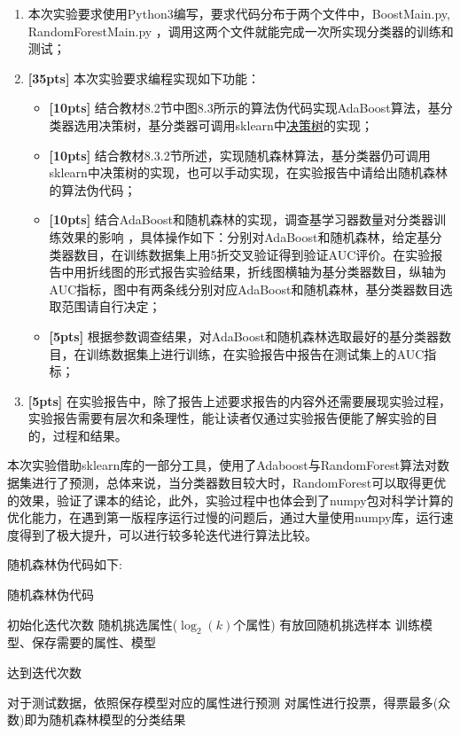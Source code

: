 \documentclass[a4paper,UTF8]{article}
\theoremstyle{definition}
\begin{document}
\begin{enumerate}[(1)]
	\item 本次实验要求使用Python3编写，要求代码分布于两个文件中，BoostMain.py, RandomForestMain.py ，调用这两个文件就能完成一次所实现分类器的训练和测试；
	
	\item \textbf{[35pts]} 本次实验要求编程实现如下功能：
	
	\begin{itemize}
		\item \textbf{[10pts]} 结合教材8.2节中图8.3所示的算法伪代码实现AdaBoost算法，基分类器选用决策树，基分类器可调用sklearn中\href{http://scikit-learn.org/stable/modules/generated/sklearn.tree.DecisionTreeClassifier.html}{决策树}的实现；
		\item \textbf{[10pts]} 结合教材8.3.2节所述，实现随机森林算法，基分类器仍可调用sklearn中决策树的实现，也可以手动实现，在实验报告中请给出随机森林的算法伪代码；
		\item \textbf{[10pts]} 结合AdaBoost和随机森林的实现，调查基学习器数量对分类器训练效果的影响 ，具体操作如下：分别对AdaBoost和随机森林，给定基分类器数目，在训练数据集上用5折交叉验证得到验证AUC评价。在实验报告中用折线图的形式报告实验结果，折线图横轴为基分类器数目，纵轴为AUC指标，图中有两条线分别对应AdaBoost和随机森林，基分类器数目选取范围请自行决定；
		\item \textbf{[5pts]} 根据参数调查结果，对AdaBoost和随机森林选取最好的基分类器数目，在训练数据集上进行训练，在实验报告中报告在测试集上的AUC指标；
	\end{itemize}
	
	\item \textbf{[5pts]} 在实验报告中，除了报告上述要求报告的内容外还需要展现实验过程，实验报告需要有层次和条理性，能让读者仅通过实验报告便能了解实验的目的，过程和结果。
	
\end{enumerate}


本次实验借助sklearn库的一部分工具，使用了Adaboost与RandomForest算法对数据集进行了预测，总体来说，当分类器数目较大时，RandomForest可以取得更优的效果，验证了课本的结论，此外，实验过程中也体会到了numpy包对科学计算的优化能力，在遇到第一版程序运行过慢的问题后，通过大量使用numpy库，运行速度得到了极大提升，可以进行较多轮迭代进行算法比较。

随机森林伪代码如下:

{\begin{algorithm}[h]
		\caption{ 随机森林伪代码 }
		\label{alg:alg2}
		\begin{algorithmic}[1]{
				\STATE 初始化迭代次数
				\REPEAT
				 随机挑选属性($\log_2(k)$个属性)
				 有放回随机挑选样本
				 训练模型、保存需要的属性、模型
		
				\UNTIL 达到迭代次数}
				 对于测试数据，依照保存模型对应的属性进行预测
				 对属性进行投票，得票最多(众数)即为随机森林模型的分类结果
		\end{algorithmic}
		
\end{algorithm}}
\end{document}

